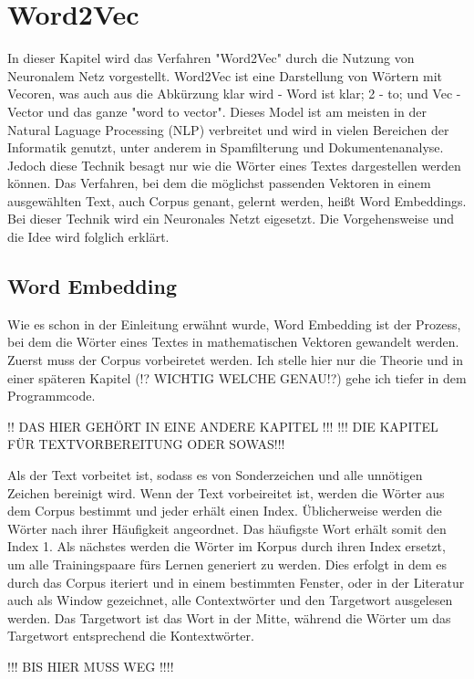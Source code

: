 \chapter{Word2Vec}

In dieser Kapitel wird das Verfahren "Word2Vec" durch die Nutzung von Neuronalem Netz vorgestellt. Word2Vec ist eine Darstellung von Wörtern mit Vecoren, was auch aus die Abkürzung klar wird - Word ist klar; 2 - to; und Vec - Vector und das ganze "word to vector". Dieses Model ist am meisten  in der Natural Laguage Processing (NLP) verbreitet und wird in vielen Bereichen der Informatik genutzt, unter anderem in Spamfilterung und Dokumentenanalyse. Jedoch diese Technik besagt nur wie die Wörter eines Textes dargestellen werden können. Das Verfahren, bei dem die möglichst passenden Vektoren in einem ausgewählten Text, auch Corpus genant, gelernt werden, heißt Word Embeddings. Bei dieser Technik wird ein Neuronales Netzt eigesetzt. Die Vorgehensweise und die Idee wird folglich erklärt.

\section{Word Embedding}

Wie es schon in der Einleitung erwähnt wurde, Word Embedding ist der Prozess, bei dem die Wörter eines Textes in mathematischen Vektoren gewandelt werden. Zuerst muss der Corpus vorbeiretet werden. Ich stelle hier nur die Theorie und in einer späteren Kapitel (!? WICHTIG WELCHE GENAU!?) gehe ich tiefer in dem Programmcode.

\!!! DAS HIER GEHÖRT IN EINE ANDERE KAPITEL !!!
!!! DIE KAPITEL FÜR TEXTVORBEREITUNG ODER SOWAS!!!

Als der Text vorbeitet ist, sodass es von Sonderzeichen und alle unnötigen Zeichen bereinigt wird. Wenn der Text vorbeireitet ist, werden die Wörter aus dem Corpus bestimmt und jeder erhält einen Index. Üblicherweise werden die Wörter nach ihrer Häufigkeit angeordnet. Das häufigste Wort erhält somit den Index 1. Als nächstes werden die Wörter im Korpus durch ihren Index ersetzt, um alle Trainingspaare fürs Lernen generiert zu werden. Dies erfolgt in dem es durch das Corpus iteriert und in einem bestimmten Fenster, oder in der Literatur auch als Window gezeichnet, alle Contextwörter und den Targetwort ausgelesen werden. Das Targetwort ist das Wort in der Mitte, während die Wörter um das Targetwort entsprechend die Kontextwörter. 

!!! BIS HIER MUSS WEG !!!!

